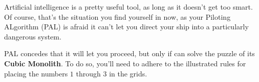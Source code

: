 Artificial intelligence is a pretty useful tool, as long as it doesn't
get too smart. Of course, that's the situation you find yourself in now,
as your Piloting ALgorithm (PAL) is afraid
it can't let you direct your ship 
into a particularly dangerous system.

PAL concedes that it will let you proceed, but only if can solve 
the puzzle of its \textbf{Cubic Monolith}.
To do so, you'll need to adhere to the illustrated rules for
placing the numbers \(1\) through \(3\) in the grids.
%

